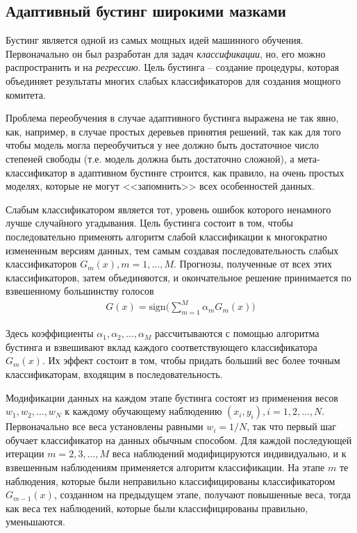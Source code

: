 \documentclass[%
	11pt,
	a4paper,
	utf8,
		]{article}
\begin{document}
\subsection{Адаптивный бустинг широкими мазками}

Бустинг является одной из самых мощных идей машинного обучения. Первоначально он был разработан для задач \emph{классификации}, но, его можно распространить и на \emph{регрессию}. Цель бустинга -- создание процедуры, которая объединяет результаты многих слабых классификаторов для создания мощного комитета.

Проблема переобучения в случае адаптивного бустинга выражена не так явно, как, например, в случае простых деревьев принятия решений, так как для того чтобы модель могла переобучиться у нее должно быть достаточное число степеней свободы (т.е. модель должна быть достаточно сложной), а мета-классификатор в адаптивном бустинге строится, как правило, на очень простых моделях, которые не могут <<запомнить>> всех особенностей данных.

Слабым классификатором является тот, уровень ошибок которого ненамного лучше случайного угадывания. Цель бустинга состоит в том, чтобы последовательно применять алгоритм слабой классификации к многократно измененным версиям данных, тем самым создавая последовательность слабых классификаторов $ G_m(x), m = 1, \ldots, M $. Прогнозы, полученные от всех этих классификаторов, затем объединяются, и окончательное решение принимается по взвешенному большинству голосов
\begin{align*}
	G(x) = \text{sign} \big( \sum_{m=1}^{M} \alpha_m G_m(x) \big)
\end{align*}

Здесь коэффициенты $ \alpha_1, \alpha_2, \ldots, \alpha_M $ рассчитываются с помощью алгоритма бустинга и взвешивают вклад каждого соответствующего классификатора $ G_m(x) $. Их эффект состоит в том, чтобы придать больший вес более точным классификаторам, входящим в последовательность.

Модификации данных на каждом этапе бустинга состоят из применения весов $ w_1, w_2, \ldots, w_N $ к каждому обучающему наблюдению $ (x_i, y_i), i = 1, 2, \ldots, N $. Первоначально все веса установлены равными $ w_i = 1/N $, так что первый шаг обучает классификатор на данных обычным способом. Для каждой последующей итерации $ m = 2, 3, \ldots, M $ веса наблюдений модифицируются индивидуально, и к взвешенным наблюдениям применяется алгоритм классификации. На этапе $ m $ те наблюдения, которые были неправильно классифицированы классификатором $ G_{m-1}(x) $, созданном на предыдущем этапе, получают повышенные веса, тогда как веса тех наблюдений, которые были классифицированы правильно, уменьшаются.
\end{document}
